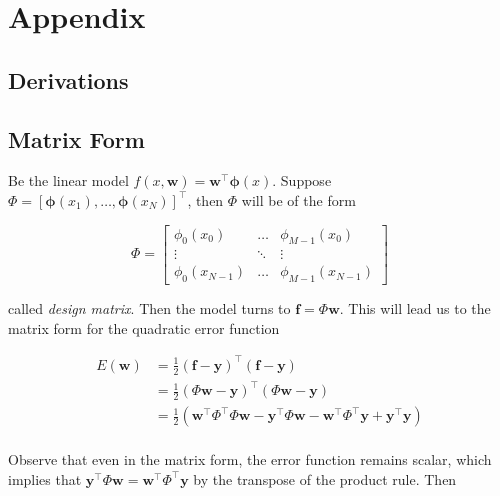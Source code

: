 \section*{\LARGE{Appendix}}

\begin{appendices}
  \section{Derivations}
  
  \subsection{Matrix Form}
  \label{subsec:app-matrix-form}
  
  Be the linear model $f(x,\mathbf{w}) = \mathbf{w}^\top \boldsymbol{\phi}(x)$. Suppose $\Phi = \left[ \boldsymbol{\phi}(x_1),\dots,\boldsymbol{\phi}(x_N) \right]^\top$, then $\Phi$ will be of the form


\begin{equation}
    \Phi =
    \begin{bmatrix}
      \phi_0(x_0) & \dots & \phi_{M-1}(x_{0}) \\
      \vdots & \ddots & \vdots \\
      \phi_{0}(x_{N-1}) & \dots & \phi_{M-1}(x_{N-1})
    \end{bmatrix}
\end{equation}

called \textit{design matrix}. Then the model turns to $\mathbf{f} = \Phi \mathbf{w}$. This will lead us to the matrix form for the quadratic error function

\begin{align*}
  E(\mathbf{w}) &= \frac{1}{2}(\mathbf{f} - \mathbf{y})^\top (\mathbf{f} - \mathbf{y}) \\
                &= \frac{1}{2}(\Phi \mathbf{w} - \mathbf{y})^\top (\Phi \mathbf{w} - \mathbf{y}) \\
                &= \frac{1}{2}(\mathbf{w}^\top \Phi^\top \Phi \mathbf{w}  - \mathbf{y}^\top \Phi \mathbf{w} - \mathbf{w}^\top \Phi^\top \mathbf{y} + \mathbf{y}^\top \mathbf{y}) \nonumber \\
\end{align*}

Observe that even in the matrix form, the error function remains scalar, which implies that $\mathbf{y}^\top \Phi \mathbf{w} = \mathbf{w}^\top \Phi^\top \mathbf{y}$ by the transpose of the product rule. Then


\end{appendices}
